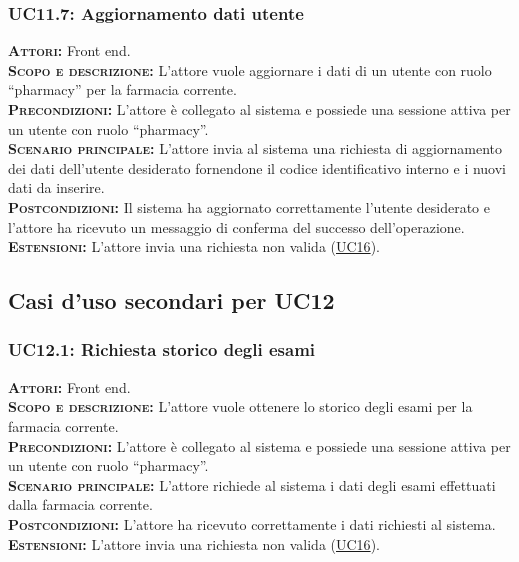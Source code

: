 \subsubsection{UC11.7: Aggiornamento dati utente}
\label{sec:UC117}
\textsc{\textbf{Attori:}} Front end.\\
\textsc{\textbf{Scopo e descrizione:}} L'attore vuole aggiornare i dati di un utente con ruolo ``pharmacy'' per la farmacia corrente.\\
\textsc{\textsc{\textbf{Precondizioni:}}} L'attore è collegato al sistema e possiede una sessione attiva per un utente con ruolo ``pharmacy''.\\
\textsc{\textbf{Scenario principale:}} L'attore invia al sistema una richiesta di aggiornamento dei dati dell'utente desiderato fornendone il codice identificativo interno e i nuovi dati da inserire.\\
\textsc{\textbf{Postcondizioni:}} Il sistema ha aggiornato correttamente l'utente desiderato e l'attore ha ricevuto un messaggio di conferma del successo dell'operazione.\\
\textsc{\textbf{Estensioni:}} L'attore invia una richiesta non valida (\hyperref[sec:UC16]{UC16}).

\subsection{Casi d'uso secondari per UC12}

\subsubsection{UC12.1: Richiesta storico degli esami}
\label{sec:UC121}
\textsc{\textbf{Attori:}} Front end.\\
\textsc{\textbf{Scopo e descrizione:}} L'attore vuole ottenere lo storico degli esami per la farmacia corrente.\\
\textsc{\textsc{\textbf{Precondizioni:}}} L'attore è collegato al sistema e possiede una sessione attiva per un utente con ruolo ``pharmacy''.\\
\textsc{\textbf{Scenario principale:}} L'attore richiede al sistema i dati degli esami effettuati dalla farmacia corrente.\\
\textsc{\textbf{Postcondizioni:}} L'attore ha ricevuto correttamente i dati richiesti al sistema.\\
\textsc{\textbf{Estensioni:}} L'attore invia una richiesta non valida (\hyperref[sec:UC16]{UC16}).

